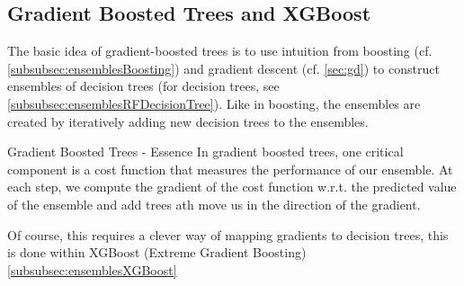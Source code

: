 \subsection{Gradient Boosted Trees and XGBoost}
\label{subsec:ensemblesGBoostedTreesandXGBoost}
The basic idea of gradient-boosted trees is to use intuition from boosting (cf. \ref{subsubsec:ensemblesBoosting}) and gradient descent (cf. \ref{sec:gd}) to construct ensembles of decision trees (for decision trees, see \ref{subsubsec:ensemblesRFDecisionTree}). Like in boosting, the ensembles are created by iteratively adding new decision trees to the ensembles. 
\begin{mybox}{Gradient Boosted Trees - Essence}
In gradient boosted trees, one critical component is a cost function that measures the performance of our ensemble. At each step, we compute the gradient of the cost function w.r.t. the predicted value of the ensemble and add trees ath move us in the direction of the gradient. 
\end{mybox}
Of course, this requires a clever way of mapping gradients to decision trees, this is done within XGBoost (Extreme Gradient Boosting) \ref{subsubsec:ensemblesXGBoost}
